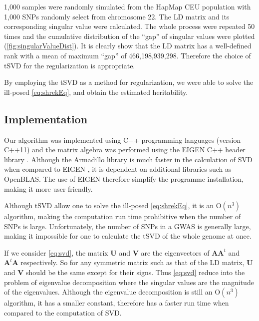 			1,000 samples were randomly simulated from the HapMap\citep{Altshuler2010} \acrshort{CEU} population with
			1,000 \glspl{SNP} randomly select from chromosome 22. 
			The \gls{LD} matrix and its corresponding singular value were calculated. 
			The whole process were repeated 50 times and the cumulative distribution of the ``gap'' of singular values were plotted (\cref{fig:singularValueDist}). 
			It is clearly show that the \gls{LD} matrix has a well-defined rank with a mean of maximum ``gap'' of 466,198,939,298.
			Therefore the choice of \gls{tSVD} for the regularization is appropriate.
			
			By employing the \gls{tSVD} as a method for regularization, we were able to solve the ill-posed \cref{eq:shrekEq}, and obtain the estimated heritability.
		\subsection{Implementation}
			Our algorithm was implemented using C++ programming languages (version C++11) and the matrix algebra was performed using the EIGEN C++ header library \citep{eigenweb}.
			Although the Armadillo library \citep{Sanderson2010} is much faster in the calculation of \gls{SVD} when compared to EIGEN \citep{Ho2011}, it is dependent on additional libraries such as OpenBLAS. 
			The use of EIGEN therefore simplify the programme installation, making it more user friendly. 
			
			Although \gls{tSVD} allow one to solve the ill-posed \cref{eq:shrekEq}, it is an $\mathrm{O}(n^3)$ algorithm, making the computation run time prohibitive when the number of \glspl{SNP} is large.
			Unfortunately, the number of \glspl{SNP} in a \gls{GWAS} is generally large, making it impossible for one to calculate the \gls{tSVD} of the whole genome at once. 
			
			If we consider \cref{eq:svd}, the matrix $\boldsymbol{U}$ and $\boldsymbol{V}$ are the eigenvectors of $\boldsymbol{AA}^t$ and $\boldsymbol{A}^t\boldsymbol{A}$ respectively. 
			So for any symmetric matrix such as that of the \gls{LD} matrix, $\boldsymbol{U}$ and $\boldsymbol{V}$ should be the same except for their signs. 
			Thus \cref{eq:svd} reduce into the problem of eigenvalue decomposition where the singular values are the magnitude of the eigenvalues. 
			Although the eigenvalue decomposition is still an $\mathrm{O}(n^3)$ algorithm, it has a smaller constant, therefore has a faster run time when compared to the computation of \gls{SVD}. 
			
